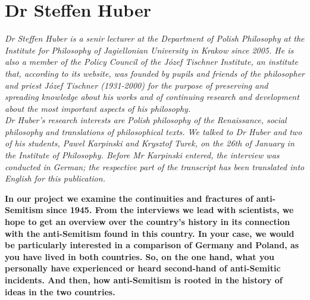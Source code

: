 \section{Dr Steffen Huber}

\textit{Dr Steffen Huber is a senir lecturer at the Department of Polish Philosophy at the Institute for Philosophy of Jagiellonian University in Krakow since 2005. He is also a member of the Policy Council of the Józef Tischner Institute, an institute that, according to its website, was founded by pupils and friends of the philosopher and priest Józef Tischner (1931-2000) for the purpose of preserving and spreading knowledge about his works and of continuing research and development about the most important aspects of his philosophy.\\ 
Dr Huber’s research interests are Polish philosophy of the Renaissance, social philosophy and translations of philosophical texts. We talked to Dr Huber and two of his students, Pawel Karpinski and Krysztof Turek, on the 26th of January in the Institute of Philosophy. Before Mr Karpinski entered, the interview was conducted in German; the respective part of the transcript has been translated into English for this publication.}\par
\vspace*{2em}
\textbf{In our project we examine the continuities and fractures of anti-Semitism since 1945. From the interviews we lead with scientists, we hope to get an overview over the country's history in its connection with the anti-Semitism found in this country. In your case, we would be particularly interested in a comparison of Germany and Poland, as you have lived in both countries. So, on the one hand, what you personally have experienced or heard second-hand of anti-Semitic incidents. And then, how anti-Semitism is rooted in the history of ideas in the two countries.} 

